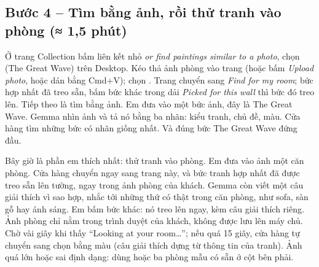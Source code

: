 \subsection{Bước 4 -- Tìm bằng ảnh, rồi thử tranh vào phòng \normalfont\small(≈ 1,5 phút)}
Ở trang Collection bấm liên kết nhỏ \emph{or find paintings similar to a photo}, chọn  (The Great Wave) trên Desktop.
Kéo thả ảnh phòng vào trang (hoặc bấm \emph{Upload photo}, hoặc dán bằng Cmd+V); chọn . Trang chuyển sang \emph{Find for my room}; bức hợp nhất đã treo sẵn, bấm bức khác trong dải \emph{Picked for this wall} thì bức đó treo lên.
Tiếp theo là tìm bằng ảnh.  Em đưa vào một bức ảnh, đây là The Great Wave. Gemma nhìn ảnh và tả nó bằng ba nhãn: kiểu tranh, chủ đề, màu. Cửa hàng tìm những bức có nhãn giống nhất. Và đúng bức The Great Wave đứng đầu.

Bây giờ là phần em thích nhất: thử tranh vào phòng.  Em đưa vào ảnh một căn phòng. Cửa hàng chuyển ngay sang trang này, và bức tranh hợp nhất đã được treo sẵn lên tường, ngay trong ảnh phòng của khách.  Gemma còn viết một câu giải thích vì sao hợp, nhắc tới những thứ có thật trong căn phòng, như sofa, sàn gỗ hay ánh sáng.  Em bấm bức khác: nó treo lên ngay, kèm câu giải thích riêng. Ảnh phòng chỉ nằm trong trình duyệt của khách, không được lưu lên máy chủ.
Chờ vài giây khi thấy ``Looking at your room\ldots''; nếu quá 15 giây, cửa hàng tự chuyển sang chọn bằng màu (câu giải thích dựng từ thông tin của tranh). Ảnh quá lớn hoặc sai định dạng: dùng  hoặc ba phòng mẫu có sẵn ở cột bên phải.

